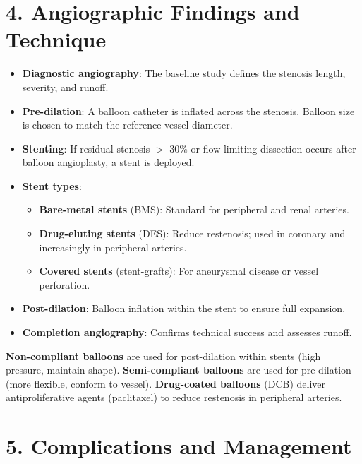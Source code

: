 \section{4. Angiographic Findings and Technique}

\begin{itemize}
  \item \textbf{Diagnostic angiography}: The baseline study defines the stenosis length, severity, and runoff.
  \item \textbf{Pre-dilation}: A balloon catheter is inflated across the stenosis. Balloon size is chosen to match the reference vessel diameter.
  \item \textbf{Stenting}: If residual stenosis $>$ 30\% or flow-limiting dissection occurs after balloon angioplasty, a stent is deployed.
  \item \textbf{Stent types}:
    \begin{itemize}
      \item \textbf{Bare-metal stents} (BMS): Standard for peripheral and renal arteries.
      \item \textbf{Drug-eluting stents} (DES): Reduce restenosis; used in coronary and increasingly in peripheral arteries.
      \item \textbf{Covered stents} (stent-grafts): For aneurysmal disease or vessel perforation.
    \end{itemize}
  \item \textbf{Post-dilation}: Balloon inflation within the stent to ensure full expansion.
  \item \textbf{Completion angiography}: Confirms technical success and assesses runoff.
\end{itemize}

\begin{pearlbox}
\textbf{Non-compliant balloons} are used for post-dilation within stents (high pressure, maintain shape). \textbf{Semi-compliant balloons} are used for pre-dilation (more flexible, conform to vessel). \textbf{Drug-coated balloons} (DCB) deliver antiproliferative agents (paclitaxel) to reduce restenosis in peripheral arteries.
\end{pearlbox}


\section{5. Complications and Management}


